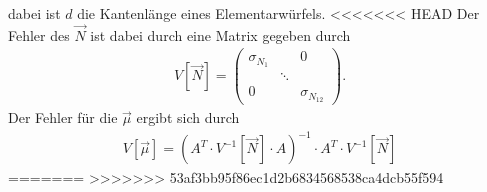 dabei ist $d$ die Kantenlänge eines Elementarwürfels.
<<<<<<< HEAD
Der Fehler des $\vec{N}$ ist dabei durch eine Matrix gegeben durch
\begin{align}
	V[\vec{N}]=
	\begin{pmatrix}
		\sigma_{N_1} &  & 0\\
		 & \ddots & \\
		0 &  &\sigma_{N_{12}}	
	\end{pmatrix}.
\end{align}
Der Fehler für die $\vec{\mu}$ ergibt sich durch
\begin{align}
	V[\vec{\mu}]=\left(A^T\cdot V^{-1}[\vec{N}]\cdot A\right)^{-1}\cdot A^T\cdot V^{-1}[\vec{N}]
\end{align}
=======
>>>>>>> 53af3bb95f86ec1d2b6834568538ca4dcb55f594
